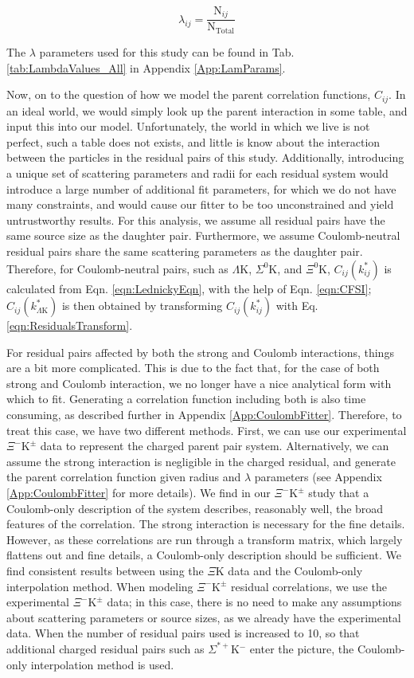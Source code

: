 \documentclass[ALICE,manyauthors]{cernphprep}
\newcommand{\LamK}{$\Lambda$K\xspace}
\newcommand{\XiKpm}{$\Xi^{-}\mathrm{K^{\pm}}$\xspace}
\begin{document}
\begin{equation}
\lambda_{ij} = \frac{\mathrm{N}_{ij}}{\mathrm{N_{Total}}}
\end{equation}

The $\lambda$ parameters used for this study can be found in Tab. \ref{tab:LambdaValues_All} in Appendix \ref{App:LamParams}.

Now, on to the question of how we model the parent correlation functions, $C_{ij}$.  
In an ideal world, we would simply look up the parent interaction in some table, and input this into our model.  
Unfortunately, the world in which we live is not perfect, such a table does not exists, and little is know about the interaction between the particles in the residual pairs of this study. 
Additionally, introducing a unique set of scattering parameters and radii for each residual system would introduce a large number of additional fit parameters, for which we do not have many constraints, and would cause our fitter to be too unconstrained and yield untrustworthy results. 
For this analysis, we assume all residual pairs have the same source size as the daughter pair.
Furthermore, we assume Coulomb-neutral residual pairs share the same scattering parameters as the daughter pair.
Therefore, for Coulomb-neutral pairs, such as \LamK, $\Sigma^{0}$K, and $\Xi^{0}$K, $C_{ij}(k^{*}_{ij})$ is calculated from Eqn. \ref{eqn:LednickyEqn}, with the help of Eqn. \ref{eqn:CFSI}; $C_{ij}(k^{*}_{\Lambda\mathrm{K}})$ is then obtained by transforming $C_{ij}(k^{*}_{ij})$ with Eq. \ref{eqn:ResidualsTransform}.  

For residual pairs affected by both the strong and Coulomb interactions, things are a bit more complicated.
This is due to the fact that, for the case of both strong and Coulomb interaction, we no longer have a nice analytical form with which to fit.
Generating a correlation function including both is also time consuming, as described further in Appendix \ref{App:CoulombFitter}.
Therefore, to treat this case, we have two different methods.
First, we can use our experimental \XiKpm data to represent the charged parent pair system.  
Alternatively, we can assume the strong interaction is negligible in the charged residual, and generate the parent correlation function given radius and $\lambda$ parameters (see Appendix \ref{App:CoulombFitter} for more details).  
We find in our \XiKpm study that a Coulomb-only description of the system describes, reasonably well, the broad features of the correlation.  
The strong interaction is necessary for the fine details.  
However, as these correlations are run through a transform matrix, which largely flattens out and fine details, a Coulomb-only description should be sufficient.  
We find consistent results between using the $\Xi$K data and the Coulomb-only interpolation method. 
When modeling \XiKpm residual correlations, we use the experimental \XiKpm data; in this case, there is no need to make any assumptions about scattering parameters or source sizes, as we already have the experimental data.  
When the number of residual pairs used is increased to 10, so that additional charged residual pairs such as $\Sigma^{*+}$K$^{-}$ enter the picture, the Coulomb-only interpolation method is used.
\end{document}
